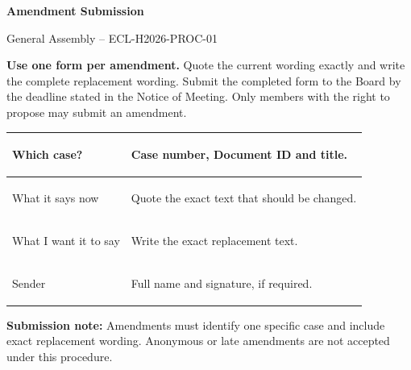 \documentclass{../../../Common/Latex/Templates/rapport}
\date{[DATE OF GENERAL ASSEMBLY -- TBD]}
\begin{document}
\reportmainmatter
\small
\setlength{\parindent}{0pt}
\setlength{\tabcolsep}{6pt}
\renewcommand{\arraystretch}{1.2}

\begin{center}
  {\Large\bfseries Amendment Submission}\par
  \vspace{0.15cm}
  {\normalsize General Assembly -- ECL-H2026-PROC-01}\par
\end{center}

\vspace{0.2cm}
\textbf{Use one form per amendment.} Quote the current wording exactly and write the complete replacement wording. Submit the completed form to the Board by the deadline stated in the Notice of Meeting. Only members with the right to propose may submit an amendment.

\vspace{0.4cm}
\begin{tabularx}{\textwidth}{|>{\bfseries\raggedright\arraybackslash}p{3.7cm}|X|}
  \hline
  Which case?           & \rule{0pt}{1.2cm}Case number, Document ID and title.          \\
  \hline
  What it says now      & \rule{0pt}{3.2cm}Quote the exact text that should be changed. \\
  \hline
  What I want it to say & \rule{0pt}{3.2cm}Write the exact replacement text.            \\
  \hline
  Sender                & \rule{0pt}{1.2cm}Full name and signature, if required.        \\
  \hline
\end{tabularx}

\vfill
\textbf{Submission note:} Amendments must identify one specific case and include exact replacement wording. Anonymous or late amendments are not accepted under this procedure.
\end{document}
